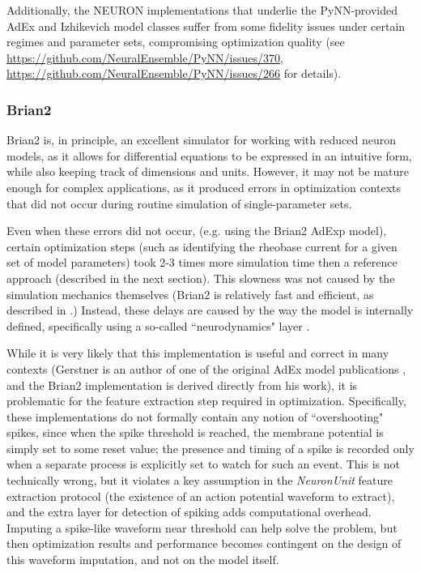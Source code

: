 
Additionally, the NEURON implementations that underlie the PyNN-provided AdEx and Izhikevich model classes suffer from some fidelity issues under certain regimes and parameter sets, compromising optimization quality (see \url{https://github.com/NeuralEnsemble/PyNN/issues/370}, \url{https://github.com/NeuralEnsemble/PyNN/issues/266} for details).

\subsubsection{Brian2}
Brian2 \citep{stimberg2019brian} is, in principle, an excellent simulator for working with reduced neuron models, as it allows for differential equations to be expressed in an intuitive form, while also keeping track of dimensions and units.
However, it may not be mature enough for complex applications, as it produced errors in optimization contexts that did not occur during routine simulation of single-parameter sets.

Even when these errors did not occur, (e.g. using the Brian2 AdExp model), certain optimization steps (such as identifying the rheobase current for a given set of model parameters) took 2-3 times more simulation time then a reference approach (described in the next section).
This slowness was not caused by the simulation mechanics themselves (Brian2 is relatively fast and efficient, as described in \cite{stimberg2019brian}.)
Instead, these delays are caused by the way the model is internally defined, specifically using a
so-called ``neurodynamics" layer \citep{gerstner2014neuronal}.

While it is very likely that this implementation is useful and correct in many contexts (Gerstner is an author of one of the original AdEx model publications \citep{brette2005adaptive}, and the Brian2 implementation is derived directly from his work), it is problematic for the feature extraction step required in optimization.
Specifically, these implementations do not formally contain any notion of ``overshooting" spikes, since when the spike threshold is reached, the membrane potential is simply set to some reset value; the presence and timing of a spike is recorded only when a separate process is explicitly set to watch for such an event.
This is not technically wrong, but it violates a key assumption in the \emph{NeuronUnit} feature extraction protocol (the existence of an action potential waveform to extract), and the extra layer for detection of spiking adds computational overhead.
Imputing a spike-like waveform near threshold can help solve the problem, but then optimization results and performance becomes contingent on the design of this waveform imputation, and not on the model itself.

